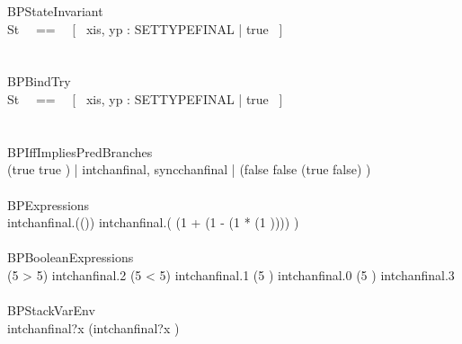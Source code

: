 \begin{circus}

 \circprocess BPStateInvariant \circdef \circbegin \\
    \circstate St ~~==~~ [~ xis, yp : SETTYPEFINAL | true ~] \\
    \circspot \Skip \\
 \circend \\

 \circprocess BPBindTry \circdef \circbegin \\
    \circstate St ~~==~~ [~ xis, yp : SETTYPEFINAL | true ~] \\
    \circspot \Skip \\
 \circend \\

 \circprocess BPIffImpliesPredBranches \circdef \circbegin \\
    \circspot (\lcircguard true \iff true \rcircguard \circguard \Skip) \lpar | \lchanset intchanfinal, syncchanfinal \rchanset | \rpar (\lcircguard false \iff false \lor (true \implies false) \rcircguard \circguard \Skip) \\
 \circend \\

 \circprocess BPExpressions \circdef \circbegin \\
    \circspot intchanfinal.(\negate ()) \then 
      intchanfinal.(
      (1 + (1 - (1 * (1 )))) 
      ) 
      \then \Skip \\
 \circend \\

 \circprocess BPBooleanExpressions \circdef \circbegin \\
    \circspot \circif (5 > 5) \circthen intchanfinal.2 \then \Skip \circelse (5 < 5) \circthen intchanfinal.1 \then \Skip \circelse (5 ) \circthen intchanfinal.0 \then \Skip \circelse (5 ) \circthen intchanfinal.3 \then \Skip \circfi \\
 \circend \\

 \circprocess BPStackVarEnv \circdef \circbegin \\
    \circspot intchanfinal?x \then (intchanfinal?x \then \Skip) \\
 \circend \\


\end{circus}
